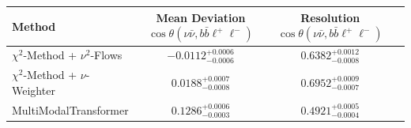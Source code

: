     \begin{tabular}{lccc}
        \toprule
        Method & Mean Deviation $\cos\theta(\nu\bar{\nu}, b\bar{b}\ell^+\ell^-)$ & Resolution $\cos\theta(\nu\bar{\nu}, b\bar{b}\ell^+\ell^-)$ \\
        \midrule
        $\chi^2$-Method + $\nu^2$-Flows & $-0.0112^{+0.0006}_{-0.0006}$ & $0.6382^{+0.0012}_{-0.0008}$ \\
        $\chi^2$-Method + $\nu$-Weighter & $0.0188^{+0.0007}_{-0.0008}$ & $0.6952^{+0.0009}_{-0.0007}$ \\
        MultiModalTransformer & $0.1286^{+0.0006}_{-0.0003}$ & $0.4921^{+0.0005}_{-0.0004}$ \\
        \bottomrule
    \end{tabular}